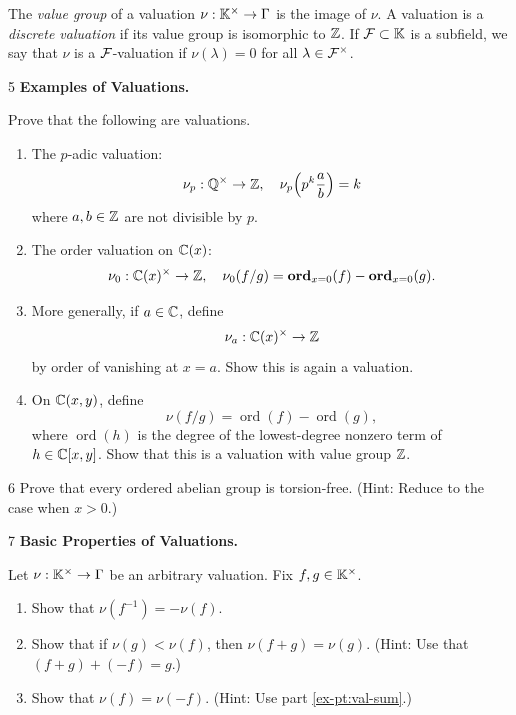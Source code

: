 \documentclass[Notebook.tex]{subfiles}
\begin{document}
    The \emph{value group} of a valuation $\nu:\mathbb K^{\times} \to \Gamma$ is the image of $\nu$. A valuation is a \emph{discrete valuation} if its value group is isomorphic to $\mathbb Z$. If $\mathcal{F} \subset \mathbb K$ is a subfield, we say that $\nu$ is a $\mathcal{F}$-valuation if $\nu(\lambda) = 0 $ for all $\lambda \in \mathcal{F}^{\times}$.

    \hrulefill

    \begin{problem}{5}
        \textbf{Examples of Valuations.} 
        
        Prove that the following are valuations.
        \begin{enumerate}[label=(\alph*),ref=\theenumi\alph*]
        \item The $p$-adic valuation:
        \[
        \nu_p:\mathbb Q^\times \to \mathbb Z,
        \quad
        \nu_p\!\left(p^k\frac{a}{b}\right)=k
        \]
        where $a,b\in \mathbb Z$ are not divisible by $p$.
        
        \item The order valuation on $\mathbb C(x)$:
        \[
        \nu_0:\mathbb C(x)^\times \to \mathbb Z,
        \quad
        \nu_0(f/g)=\operatorname{\textbf{ord}}_{x=0}(f)-\operatorname{\textbf{ord}}_{x=0}(g).
        \]
        
        \item More generally, if $a\in \mathbb C$, define
        \[
        \nu_a:\mathbb C(x)^\times \to \mathbb Z
        \]
        by order of vanishing at $x=a$. Show this is again a valuation.
        
        \item On $\mathbb C(x,y)$, define
        \[
        \nu(f/g)=\operatorname{ord}(f)-\operatorname{ord}(g),
        \]
        where $\operatorname{ord}(h)$ is the degree of the lowest-degree nonzero term of $h\in \mathbb C[x,y]$. Show that this is a valuation with value group $\mathbb Z$.
        \end{enumerate}
    \end{problem}
	
    \begin{problem}{6}
        Prove that every ordered abelian group is torsion-free. (Hint: Reduce to the case when $x>0$.)
    \end{problem}

    \begin{problem}{7}
        \textbf{Basic Properties of Valuations.} 
        
        Let $\nu:\mathbb K^{\times} \to \Gamma$ be an arbitrary valuation. Fix $f,g \in \mathbb K^{\times}$.
        \begin{enumerate}[label=(\alph*),ref=\theenumi\alph*]
            \item Show that $\nu(f^{-1}) = -\nu(f)$.
            \item\label{ex-pt:val-sum} Show that if $\nu(g) < \nu(f)$, then $\nu(f+g) = \nu(g).$ (Hint: Use that $(f+g) + (-f) = g$.)
            \item Show that  $\nu(f) = \nu (-f)$. (Hint: Use part \ref{ex-pt:val-sum}.)
        \end{enumerate}
    \end{problem}
\end{document}
